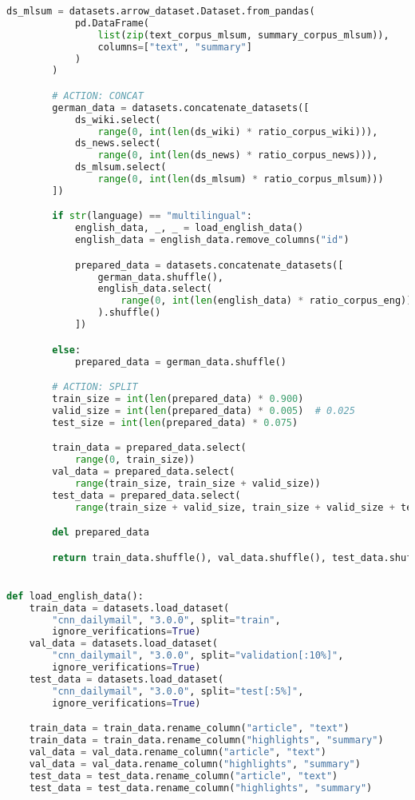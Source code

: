 \begin{lstlisting}[language=Python, caption=Hilfsmethoden]
        ds_mlsum = datasets.arrow_dataset.Dataset.from_pandas(
            pd.DataFrame(
                list(zip(text_corpus_mlsum, summary_corpus_mlsum)),
                columns=["text", "summary"]
            )
        )

        # ACTION: CONCAT
        german_data = datasets.concatenate_datasets([
            ds_wiki.select(
                range(0, int(len(ds_wiki) * ratio_corpus_wiki))),
            ds_news.select(
                range(0, int(len(ds_news) * ratio_corpus_news))),
            ds_mlsum.select(
                range(0, int(len(ds_mlsum) * ratio_corpus_mlsum)))
        ])

        if str(language) == "multilingual":
            english_data, _, _ = load_english_data()
            english_data = english_data.remove_columns("id")

            prepared_data = datasets.concatenate_datasets([
                german_data.shuffle(),
                english_data.select(
                    range(0, int(len(english_data) * ratio_corpus_eng))
                ).shuffle()
            ])

        else:
            prepared_data = german_data.shuffle()

        # ACTION: SPLIT
        train_size = int(len(prepared_data) * 0.900)
        valid_size = int(len(prepared_data) * 0.005)  # 0.025
        test_size = int(len(prepared_data) * 0.075)

        train_data = prepared_data.select(
            range(0, train_size))
        val_data = prepared_data.select(
            range(train_size, train_size + valid_size))
        test_data = prepared_data.select(
            range(train_size + valid_size, train_size + valid_size + test_size))

        del prepared_data

        return train_data.shuffle(), val_data.shuffle(), test_data.shuffle()


def load_english_data():
    train_data = datasets.load_dataset(
        "cnn_dailymail", "3.0.0", split="train",
        ignore_verifications=True)
    val_data = datasets.load_dataset(
        "cnn_dailymail", "3.0.0", split="validation[:10%]",
        ignore_verifications=True)
    test_data = datasets.load_dataset(
        "cnn_dailymail", "3.0.0", split="test[:5%]",
        ignore_verifications=True)

    train_data = train_data.rename_column("article", "text")
    train_data = train_data.rename_column("highlights", "summary")
    val_data = val_data.rename_column("article", "text")
    val_data = val_data.rename_column("highlights", "summary")
    test_data = test_data.rename_column("article", "text")
    test_data = test_data.rename_column("highlights", "summary")


\end{lstlisting}
